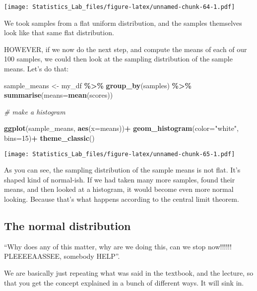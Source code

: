\documentclass[
]{book}
\newenvironment{Shaded}{\begin{snugshade}}{\end{snugshade}}
\newcommand{\AttributeTok}[1]{\textcolor[rgb]{0.13,0.29,0.53}{#1}}
\newcommand{\CommentTok}[1]{\textcolor[rgb]{0.56,0.35,0.01}{\textit{#1}}}
\newcommand{\DecValTok}[1]{\textcolor[rgb]{0.00,0.00,0.81}{#1}}
\newcommand{\FunctionTok}[1]{\textcolor[rgb]{0.13,0.29,0.53}{\textbf{#1}}}
\newcommand{\NormalTok}[1]{#1}
\newcommand{\OtherTok}[1]{\textcolor[rgb]{0.56,0.35,0.01}{#1}}
\newcommand{\SpecialCharTok}[1]{\textcolor[rgb]{0.81,0.36,0.00}{\textbf{#1}}}
\newcommand{\StringTok}[1]{\textcolor[rgb]{0.31,0.60,0.02}{#1}}
\begin{document}
\texttt{[image: Statistics\_Lab\_files/figure-latex/unnamed-chunk-64-1.pdf]}

We took samples from a flat uniform distribution, and the samples
themselves look like that same flat distribution.

HOWEVER, if we now do the next step, and compute the means of each of
our 100 samples, we could then look at the sampling distribution of the
sample means. Let's do that:

\begin{Shaded}
\begin{Highlighting}[]
\NormalTok{sample\_means }\OtherTok{\textless{}{-}}\NormalTok{ my\_df }\SpecialCharTok{\%\textgreater{}\%}
                \FunctionTok{group\_by}\NormalTok{(samples) }\SpecialCharTok{\%\textgreater{}\%}
                \FunctionTok{summarise}\NormalTok{(}\AttributeTok{means=}\FunctionTok{mean}\NormalTok{(scores))}

\CommentTok{\# make a histogram}

 \FunctionTok{ggplot}\NormalTok{(sample\_means, }\FunctionTok{aes}\NormalTok{(}\AttributeTok{x=}\NormalTok{means))}\SpecialCharTok{+}
  \FunctionTok{geom\_histogram}\NormalTok{(}\AttributeTok{color=}\StringTok{"white"}\NormalTok{, }\AttributeTok{bins=}\DecValTok{15}\NormalTok{)}\SpecialCharTok{+}
  \FunctionTok{theme\_classic}\NormalTok{()}
\end{Highlighting}
\end{Shaded}

\texttt{[image: Statistics\_Lab\_files/figure-latex/unnamed-chunk-65-1.pdf]}

As you can see, the sampling distribution of the sample means is not
flat. It's shaped kind of normal-ish. If we had taken many more samples,
found their means, and then looked at a histogram, it would become even
more normal looking. Because that's what happens according to the
central limit theorem.

\hypertarget{the-normal-distribution}{%
\subsection{The normal distribution}\label{the-normal-distribution}}

``Why does any of this matter, why are we doing this, can we stop
now!!!!!! PLEEEEAASSEE, somebody HELP''.

We are basically just repeating what was said in the textbook, and the
lecture, so that you get the concept explained in a bunch of different
ways. It will sink in.
\end{document}
